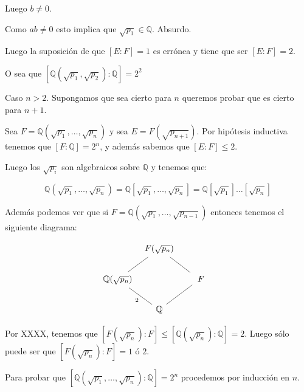 \documentclass{article}
\def\Q{\mathbb{Q}}
\theoremstyle{definition}
\begin{document}
Luego $b \ne 0$.

Como $ab \ne 0$ esto implica que $\sqrt{p_1} \in \Q$.
Absurdo.

Luego la suposición de que $[E:F] = 1$ es errónea y tiene
que ser $[E:F] = 2$.

O sea que $[\Q(\sqrt{p_1}, \sqrt{p_2}):\Q] = 2^2$

Caso $n > 2$. Supongamos que sea cierto para $n$ queremos probar que
es cierto para $n + 1$.

Sea $F = \Q(\sqrt{p_1},\dots,\sqrt{p_n})$ y sea $E = F(\sqrt{p_{n+1}})$.
Por hipótesis inductiva tenemos que $[F:\Q] = 2^n$, y además
sabemos que $[E:F] \le 2$.


Luego los $\sqrt{p_i}$ son algebraicos sobre $\Q$ y tenemos que:

\[\Q(\sqrt{p_1},\dots,\sqrt{p_n}) = \Q[\sqrt{p_1},\dots,\sqrt{p_n}] = \Q[\sqrt{p_1}]\dots[\sqrt{p_n}] \]

Además podemos ver que si $F = \Q(\sqrt{p_1},\dots,\sqrt{p_{n-1}})$ 
entonces tenemos el siguiente diagrama:

\[
\begin{tikzcd}[column sep=tiny]
    & F(\sqrt{p_n}) \arrow[ld, dash] \arrow[rd, dash] & \\
\Q(\sqrt{p_n}) \arrow[rd, dash, "2"'] & & \ \quad F\quad \arrow[ld, dash] \\
& \Q & 
\end{tikzcd}
\]

Por XXXX, tenemos que $[F(\sqrt{p_n}):F] \le [\Q(\sqrt{p_n}):\Q] = 2$.
Luego sólo puede ser que $[F(\sqrt{p_n}):F] = 1$ ó $2$.

Para probar que $[\Q(\sqrt{p_1},\dots,\sqrt{p_n}):\Q] = 2^n$ procedemos 
por inducción en $n$.
\end{document}
